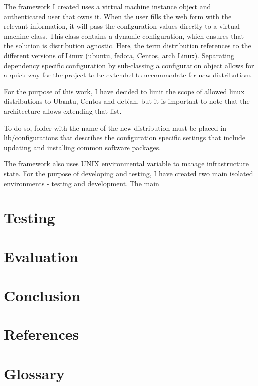 \documentclass{article}
\begin{document}
The framework I created uses a virtual machine instance object and authenticated user that owns it. When the user fills the web form with the relevant information, it will pass the configuration values directly to a virtual machine class. This class contains a dynamic configuration, which ensures that the solution is distribution agnostic. Here, the term distribution references to the different versions of Linux (ubuntu, fedora, Centos, arch Linux). Separating dependency specific configuration by sub-classing a configuration object allows for a quick way for the project to be extended to accommodate for new distributions. 

For the purpose of this work, I have decided to limit the scope of allowed linux distributions to Ubuntu, Centos and debian, but it is important to note that the architecture allows extending that list.

To do so, folder with the name of the new distribution must be placed in lib/configurations that describes the configuration specific settings that include updating and installing common software packages.

The framework also uses UNIX environmental variable to manage infrastructure state. For the  purpose of developing and testing, I have created two main isolated environments - testing and development.
The main 

  \newpage
  

  \newpage
  \section{Testing}

  \newpage
  \section{Evaluation}

  \newpage
  \section{Conclusion}

  \newpage
  \section{References}
	
	\renewcommand{\bibname}{}
  \section{Glossary}
  	\printglossary
  \newpage
\end{document}
